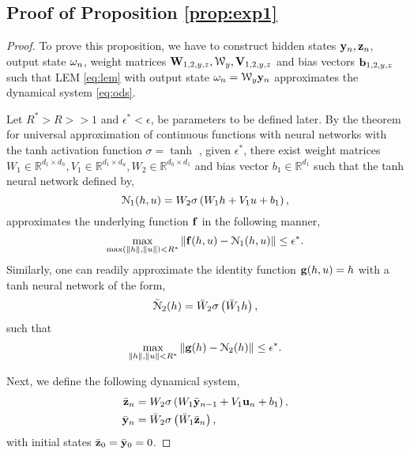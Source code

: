 \documentclass{article} \usepackage{iclr2022_conference,times}
\newcommand{\by}{{\bf y}}
\newcommand{\bz}{{\bf z}}
\newcommand{\bW}{{\bf W}}
\newcommand{\bu}{{\bf u}}
\newcommand{\bb}{{\bf b}}
\newcommand{\bV}{{\bf V}}
\newcommand{\R}{{\mathbb R}}
\newcommand{\cN}{\EuScript{N}}
\newcommand{\bif}{{\bf f}}
\newcommand{\bg}{{\bf g}}
\newcommand{\cW}{\EuScript{W}}
\newcommand{\bom}{{\bf \omega}}
\begin{document}
\subsection{Proof of Proposition \ref{prop:exp1}}
\label{app:exp1pf}
\begin{proof}
To prove this proposition, we have to construct hidden states $\by_n,\bz_n$, output state $\bom_n$, weight matrices $\bW_{1,2,y,z},\cW_{y}, \bV_{1,2,y,z}$ and bias vectors $\bb_{1,2,y,z}$ such that LEM \eqref{eq:lem} with output state $\bom_n = \cW_y \by_n$ approximates the dynamical system \eqref{eq:ods}. 



Let $R^{\ast} > R >> 1$ and $\epsilon^{\ast} < \epsilon$, be parameters to be defined later. By the theorem for universal approximation of continuous functions with neural networks with the tanh activation function $\sigma = \tanh$ \citep{BAR1}, given $\epsilon^{\ast}$, there exist weight matrices $W_1 \in \R^{d_1 \times d_h}, V_1 \in \R^{d_1\times d_u}, W_2 \in \R^{d_h \times d_1}$ and bias vector $b_1 \in \R^{d_1}$ such that the tanh neural network defined by,
\begin{equation}
\label{eq:n1}
\cN_1(h,u) = W_2\sigma\left(W_1 h + V_1 u + b_1 \right),
\end{equation}
approximates the underlying function $\bif$ in the following manner, 
\begin{equation}
    \label{eq:exp11}
    \max\limits_{\max(\|h\|,\|u\|)< R^{\ast}} \|\bif(h,u) - \cN_1(h,u) \| \leq \epsilon^{\ast}.
\end{equation}
Similarly, one can readily approximate the identity function $\bg(h,u) = h$ with a tanh neural network of the form,
\begin{equation}
\label{eq:n2}
\bar{\cN}_2(h) = \bar{W}_2\sigma\left(\bar{W}_1 h \right),
\end{equation}
 such that
\begin{equation}
    \label{eq:exp12}
    \max\limits_{\|h\|,\|u\|< R^{\ast}} \|\bg(h) - \cN_2(h) \| \leq \epsilon^{\ast}.
\end{equation}

Next, we define the following dynamical system,
\begin{equation}
    \label{eq:exp14}
    \begin{aligned}
\bar{\bz}_n &= W_2\sigma\left(W_1 \bar{\by}_{n-1} + V_1 \bu_n + b_1 \right), \\
\bar{\by}_n &= \bar{W}_2\sigma\left(\bar{W}_1 \bar{\bz}_n \right),
    \end{aligned}
\end{equation}
with initial states $\bar{\bz}_0=\bar{\by}_0 = 0$.


\end{proof}
\end{document}
